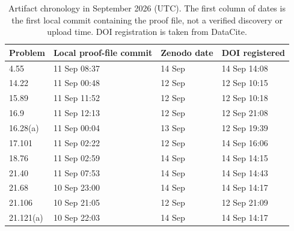 \begin{table}[htbp]
\centering\small
\caption{Artifact chronology in September 2026 (UTC). The first column of
 dates is the first local commit containing the proof file, not a verified
 discovery or upload time. DOI registration is taken from DataCite.}
\label{tab:v2-chronology}
\begin{tabular}{@{}llll@{}}
\toprule
Problem & Local proof-file commit & Zenodo date & DOI registered\\\midrule
4.55 & 11 Sep 08:37 & 14 Sep & 14 Sep 14:08\\
14.22 & 11 Sep 00:48 & 12 Sep & 12 Sep 10:15\\
15.89 & 11 Sep 11:52 & 12 Sep & 12 Sep 10:18\\
16.9 & 11 Sep 12:13 & 12 Sep & 12 Sep 21:08\\
16.28(a) & 11 Sep 00:04 & 13 Sep & 12 Sep 19:39\\
17.101 & 11 Sep 02:22 & 12 Sep & 14 Sep 16:06\\
18.76 & 11 Sep 02:59 & 14 Sep & 14 Sep 14:15\\
21.40 & 11 Sep 07:53 & 14 Sep & 14 Sep 14:43\\
21.68 & 10 Sep 23:00 & 14 Sep & 14 Sep 14:17\\
21.106 & 10 Sep 21:05 & 12 Sep & 12 Sep 21:09\\
21.121(a) & 10 Sep 22:03 & 14 Sep & 14 Sep 14:17\\
\bottomrule
\end{tabular}
\end{table}
